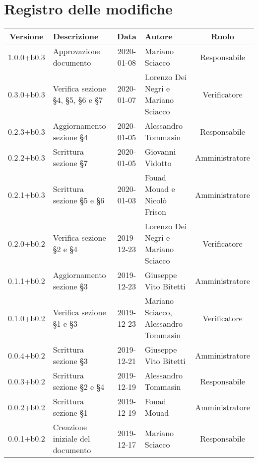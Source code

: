 \section*{Registro delle modifiche}

\begin{center}
	\begin{longtable}{|c|p{3cm}|c|p{4cm}|c|}
	\hline
	\rowcolor{lighter-grayer}
	\textbf{Versione} & \textbf{Descrizione} & \textbf{Data} & \textbf{Autore} & \textbf{Ruolo} \\
	\hline
	\endfirsthead

	1.0.0+b0.3 & Approvazione documento & 2020-01-08 & Mariano Sciacco & Responsabile \\
	\hline 
	0.3.0+b0.3 & Verifica sezione \S4, \S5, \S6 e \S7 & 2020-01-07 & Lorenzo Dei Negri e Mariano Sciacco & Verificatore \\
	\hline
	0.2.3+b0.3 & Aggiornamento sezione \S4  & 2020-01-05 & Alessandro Tommasin & Responsabile \\
	\hline  
	0.2.2+b0.3 & Scrittura sezione \S7  & 2020-01-05 & Giovanni Vidotto & Amministratore \\
	\hline 
	0.2.1+b0.3 & Scrittura sezione \S5 e \S6  & 2020-01-03 & Fouad Mouad e Nicolò Frison & Amministratore \\
	\hline 
	0.2.0+b0.2 & Verifica sezione \S2 e \S4  & 2019-12-23 & Lorenzo Dei Negri e Mariano Sciacco & Verificatore \\
	\hline 
	0.1.1+b0.2 & Aggiornamento sezione \S3 & 2019-12-23 & Giuseppe Vito Bitetti & Amministratore \\
	\hline
	0.1.0+b0.2 & Verifica sezione \S1 e \S3 & 2019-12-23 & Mariano Sciacco, Alessandro Tommasin & Verificatore \\
	\hline 
	0.0.4+b0.2 & Scrittura sezione \S3 & 2019-12-21 & Giuseppe Vito Bitetti & Amministratore \\
	\hline 
	0.0.3+b0.2 & Scrittura sezione \S2 e \S4 & 2019-12-19 & Alessandro Tommasin & Responsabile \\
	\hline 
	0.0.2+b0.2 & Scrittura sezione \S1 & 2019-12-19 & Fouad Mouad & Amministratore \\
	\hline 
	0.0.1+b0.2 & Creazione iniziale del documento & 2019-12-17 & Mariano Sciacco & Responsabile \\
	\hline
	

	\end{longtable}
\end{center}